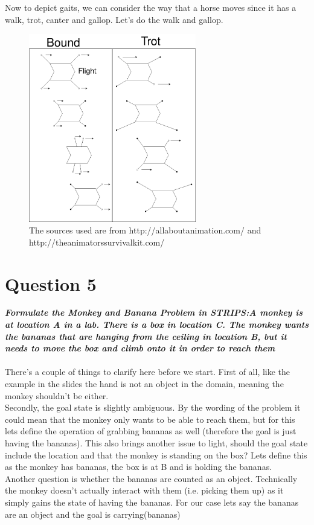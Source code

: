 \documentclass{article}
\newcommand\tab[1][1cm]{\hspace*{#1}}
\begin{document}
Now to depict gaits, we can consider the way that a horse moves since it has a walk,
trot, canter and gallop. Let's do the walk and gallop.
\begin{figure}[ht]
    \centering
    \includegraphics[width=0.65\textwidth]{img/gait-walk}
    \caption{The sources used are from http://allaboutanimation.com/ and 
    http://theanimatorssurvivalkit.com/}
\end{figure}
\section*{Question 5}
\textbf{\textit{
    \tab Formulate the Monkey and Banana Problem in STRIPS:A monkey is at location A in a lab. There is a box in location C. The monkey wants the bananas that are hanging from the ceiling in location B, but it needs to move the box and climb onto it in order to reach them
}} \\ \\
There's a couple of things to clarify here before we start. First of all, like
the example in the slides the hand is not an object in the domain, meaning the 
monkey shouldn't be either. \\
\tab Secondly, the goal state is slightly ambiguous.
By the wording of the problem it could mean that the monkey only wants to be able
to reach them, but for this lets define the operation of grabbing bananas as well
(therefore the goal is just having the bananas).
This also brings another issue to light, should the goal state include the location
and that the monkey is standing on the box? Lets define this as the monkey has bananas, the box is at B and is holding the bananas. \\
\tab Another question is whether the bananas are counted as an object.
Technically the monkey doesn't actually interact with them (i.e. picking them up) as it simply gains the state of having the bananas. 
For our case lets say the bananas are an object and the goal is carrying(bananas) 
\end{document}
